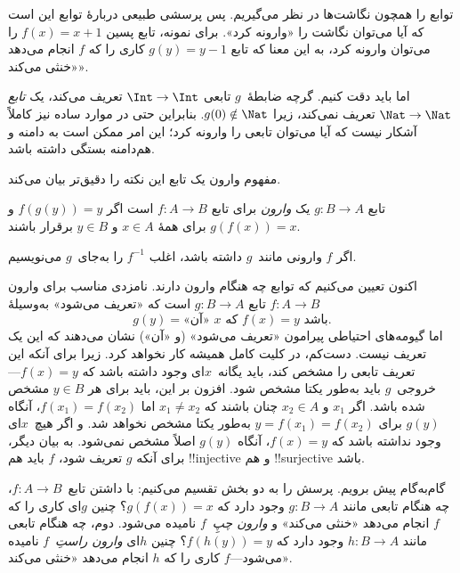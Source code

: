 \documentclass[../../../include/open-logic-section]{subfiles}
\begin{document}

\begin{explain}
توابع را همچون نگاشت‌ها در نظر می‌گیریم. پس پرسشی طبیعی دربارهٔ
توابع این است که آیا می‌توان نگاشت را «وارونه کرد». برای
نمونه، تابع پسین $f(x) = x + 1$ را می‌توان وارونه کرد، به
این معنا که تابع $g(y) = y - 1$ کاری را که $f$ انجام می‌دهد «خنثی می‌کند».

اما باید دقت کنیم. گرچه ضابطهٔ~$g$ تابعی
$\Int \to \Int$ تعریف می‌کند، یک \emph{تابع} $\Nat
\to \Nat$ تعریف نمی‌کند، زیرا $g(0) \notin \Nat$. بنابراین حتی در موارد ساده نیز
کاملاً آشکار نیست که آیا می‌توان تابعی را وارونه کرد؛ این امر ممکن است به
دامنه و هم‌دامنه بستگی داشته باشد.

مفهوم وارون یک تابع این نکته را دقیق‌تر بیان می‌کند.
\end{explain}

\begin{defn}
تابع $g \colon B \to A$ یک \emph{وارون} برای تابع $f
\colon A \to B$ است اگر $f(g(y)) = y$ و $g(f(x)) = x$ برای همهٔ $x \in A$
و $y \in B$ برقرار باشند.
\end{defn}

اگر $f$ وارونی مانند~$g$ داشته باشد، اغلب $f^{-1}$ را به‌جای~$g$ می‌نویسیم.

\begin{explain}
اکنون تعیین می‌کنیم که توابع چه هنگام وارون دارند. نامزدی مناسب
برای وارون $f\colon A \to B$ تابع $g\colon B \to A$ است که «تعریف
می‌شود» به‌وسیلهٔ
\[
g(y) = \text{«آن» $x$ که $f(x) = y$ باشد.}
\]
اما گیومه‌های احتیاطی پیرامون «تعریف می‌شود» (و «آن») نشان می‌دهند که
این یک تعریف نیست. دست‌کم، در کلیت کامل همیشه کار
نخواهد کرد. زیرا برای آنکه این تعریف تابعی را مشخص کند، باید یگانه~$x$ای
وجود داشته باشد که $f(x) =
y$---خروجی~$g$ باید به‌طور یکتا مشخص شود. افزون بر این، باید
برای هر $y \in B$ مشخص شده باشد. اگر $x_1$ و $x_2 \in
A$ چنان باشند که $x_1 \neq x_2$ اما $f(x_1) = f(x_2)$، آنگاه $g(y)$ برای
$y = f(x_1) = f(x_2)$ به‌طور یکتا مشخص نخواهد شد. و اگر هیچ~$x$ای
وجود نداشته باشد که $f(x) = y$، آنگاه $g(y)$ اصلاً مشخص نمی‌شود. به
بیان دیگر، برای آنکه $g$ تعریف شود، $f$ باید هم !!{injective} و هم
!!{surjective} باشد.

گام‌به‌گام پیش برویم. پرسش را به دو بخش تقسیم می‌کنیم: با داشتن
تابع~$f\colon A \to B$، چه هنگام تابعی مانند $g\colon B \to A$
وجود دارد که $g(f(x)) = x$؟ چنین $g$ای کاری را که $f$ انجام می‌دهد «خنثی می‌کند» و
\emph{وارون چپِ}~$f$ نامیده می‌شود. دوم، چه هنگام
تابعی مانند $h\colon B \to A$ وجود دارد که $f(h(y)) = y$؟ چنین $h$ای
\emph{وارون راستِ}~$f$ نامیده می‌شود---$f$ کاری را که $h$ انجام می‌دهد «خنثی می‌کند».
\end{explain}
\end{document}
